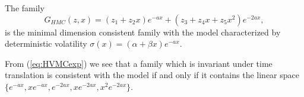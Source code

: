 \begin{propos} The family
\begin{equation}
\label{HMC}
G_{HMC}(z,x)=(z_1+z_2 x)e^{-a x}+(z_3+z_4 x+z_5 x^2)e^{-2 a x},
\end{equation}
is the minimal dimension consistent family with the model
characterized by deterministic volatility $\sigma(x)=(\alpha+\beta
x)e^{-a x}$.
\end{propos}
\begin{demo}
From (\ref{eq:HVMCexp}) we see that a family which is invariant under time translation is
consistent with the model if and only if it contains the linear space
$\{e^{-ax},xe^{-ax},e^{-2ax},xe^{-2ax},x^2e^{-2ax}\}$. 
\end{demo}


